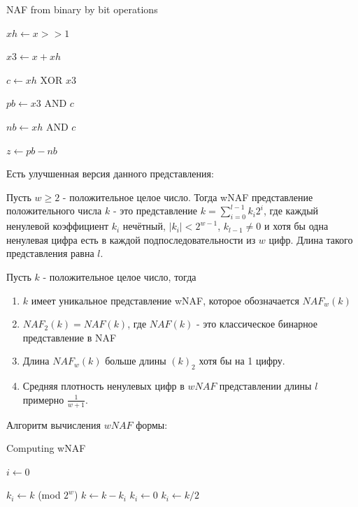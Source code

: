 \begin{itemize}
\begin{enumerate}
      \begin{algorithm}[H]
        \caption{NAF from binary by bit operations}
        $xh\gets x >> 1$

        $x3\gets x + xh$

        $c\gets xh \text{ XOR } x3$

        $pb\gets x3 \text{ AND } c$

        $nb\gets xh \text{ AND } c$

        $z\gets pb - nb$
      \end{algorithm}
      Есть улучшенная версия данного представления:

      \begin{definition}
        Пусть $w\geqslant 2$ - положительное целое число. Тогда wNAF представление положительного числа $k$ - это представление $k=\sum_{i=0}^{l-1}k_i2^i$, где каждый ненулевой коэффициент $k_i$ нечётный, $|k_i|<2^{w-1}$, $k_{l-1}\neq 0$ и хотя бы одна ненулевая цифра есть в каждой подпоследовательности из $w$ цифр. Длина такого представления равна $l$. 
      \end{definition}
      \begin{theorem} Пусть $k$ - положительное целое число, тогда 
        \begin{enumerate}
          \item $k$ имеет уникальное представление wNAF, которое обозначается $NAF_w(k)$
          \item $NAF_2(k)=NAF(k)$, где $NAF(k)$ - это классическое бинарное представление в NAF 
          \item Длина $NAF_w(k)$ больше длины $(k)_2$ хотя бы на 1 цифру. 
          \item Средняя плотность ненулевых цифр в $wNAF$ представлении длины $l$ примерно $\frac{1}{w+1}$. 
        \end{enumerate}
      \end{theorem}
      Алгоритм вычисления $wNAF$ формы:

        \begin{algorithm}[H]
        \caption{Computing wNAF}
       $i\gets 0$

           {
             {
              $k_i\gets k$ (mod $2^w$)
              $k\gets k - k_i$
            } {
              $k_i\gets 0$
            }
            $k_i\gets k/2$

}
\end{algorithm}
\end{enumerate}
\end{itemize}
